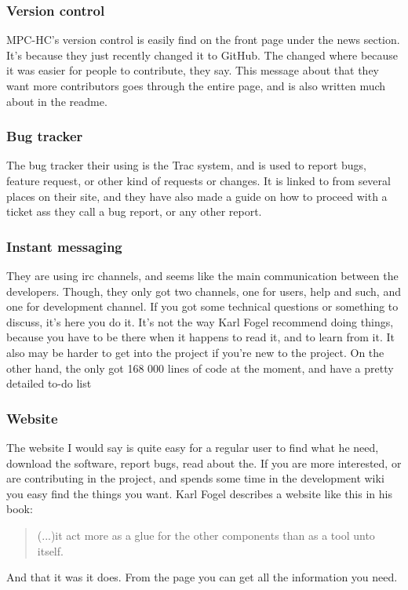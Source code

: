 \documentclass{report} %
\begin{document}
\subsubsection{Version control}
MPC-HC's version control is easily find on the front page\cite{mpcweb} under the news section. It's because they just recently changed it to GitHub. The changed where because it was easier for people to contribute, they say. This message about that they want more contributors goes through the entire page, and is also written much about in the readme\cite{mpcsource}.
\subsubsection{Bug tracker}
The bug tracker their using is the Trac\cite{tracweb} system, and is used to report bugs, feature request, or other kind of requests or changes. It is linked to from several places on their site, and they have also made a guide\cite{mpcbugguide} 
on how to proceed with a ticket ass they call a bug report, or any other report. 
\subsubsection{Instant messaging}
They are using irc channels\cite{mpccontact}, and seems like the main communication between the developers. Though, they only got two channels, one for users, help and such, and one for development channel. If you got some technical questions or something to discuss, it's here you do it. It's not the way Karl Fogel recommend doing things, because you have to be there when it happens to read it, and to learn from it. It also may be harder to get into the project if you're new to the project. On the other hand, the only got 168 000 lines of code\cite{ohlohmpc} at the moment, and have a pretty detailed to-do list\cite{mpctodo}
\subsubsection{Website}
The website I would say is quite easy for a regular user to find what he need, download the software, report bugs, read about the. If you are more interested, or are contributing in the project, and spends some time in the development wiki\cite{mpcwiki} you easy find the things you want. Karl Fogel describes a website like this in his book:\begin{quotation}
(...)it act more as a glue for the other components than as a tool unto itself.\cite{kfposs}
\end{quotation} 
And that it was it does. From the page you can get all the information you need.
\end{document}
